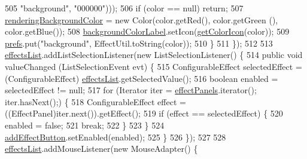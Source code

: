 \begin{DoxyCode}
505                     \textcolor{stringliteral}{"background"}, \textcolor{stringliteral}{"000000"})));
506                 \textcolor{keywordflow}{if} (color == null) \textcolor{keywordflow}{return};
507                 \mbox{\hyperlink{classorg_1_1newdawn_1_1slick_1_1tools_1_1hiero_1_1_hiero_a5160d483a3f8ea0a78cfbed01abe5855}{renderingBackgroundColor}} = \textcolor{keyword}{new} Color(color.getRed(), color.getGreen
      (), color.getBlue());
508                 \mbox{\hyperlink{classorg_1_1newdawn_1_1slick_1_1tools_1_1hiero_1_1_hiero_a04c540a8cc98417075e589a6aa7e0ad1}{backgroundColorLabel}}.setIcon(\mbox{\hyperlink{classorg_1_1newdawn_1_1slick_1_1tools_1_1hiero_1_1_hiero_a965ca93fb655336c8320938445d75ece}{getColorIcon}}(color));
509                 \mbox{\hyperlink{classorg_1_1newdawn_1_1slick_1_1tools_1_1hiero_1_1_hiero_aa7062bea3ffd4639b589cd06000dbfc6}{prefs}}.put(\textcolor{stringliteral}{"background"}, EffectUtil.toString(color));
510             \}
511         \});
512 
513         \mbox{\hyperlink{classorg_1_1newdawn_1_1slick_1_1tools_1_1hiero_1_1_hiero_aff0431ced360227e02cdf9bcd21fd4d2}{effectsList}}.addListSelectionListener(\textcolor{keyword}{new} ListSelectionListener() \{
514             \textcolor{keyword}{public} \textcolor{keywordtype}{void} valueChanged (ListSelectionEvent evt) \{
515                 ConfigurableEffect selectedEffect = (ConfigurableEffect)
      \mbox{\hyperlink{classorg_1_1newdawn_1_1slick_1_1tools_1_1hiero_1_1_hiero_aff0431ced360227e02cdf9bcd21fd4d2}{effectsList}}.getSelectedValue();
516                 \textcolor{keywordtype}{boolean} enabled = selectedEffect != null;
517                 \textcolor{keywordflow}{for} (Iterator iter = \mbox{\hyperlink{classorg_1_1newdawn_1_1slick_1_1tools_1_1hiero_1_1_hiero_a84dc85d78d9ad7b44e24e045b0a0cd84}{effectPanels}}.iterator(); iter.hasNext();) \{
518                     ConfigurableEffect effect = ((EffectPanel)iter.next()).getEffect();
519                     \textcolor{keywordflow}{if} (effect == selectedEffect) \{
520                         enabled = \textcolor{keyword}{false};
521                         \textcolor{keywordflow}{break};
522                     \}
523                 \}
524                 \mbox{\hyperlink{classorg_1_1newdawn_1_1slick_1_1tools_1_1hiero_1_1_hiero_a7dd9542f73944fa537d025f2c87f1b20}{addEffectButton}}.setEnabled(enabled);
525             \}
526         \});
527 
528         \mbox{\hyperlink{classorg_1_1newdawn_1_1slick_1_1tools_1_1hiero_1_1_hiero_aff0431ced360227e02cdf9bcd21fd4d2}{effectsList}}.addMouseListener(\textcolor{keyword}{new} MouseAdapter() \{

\end{DoxyCode}
